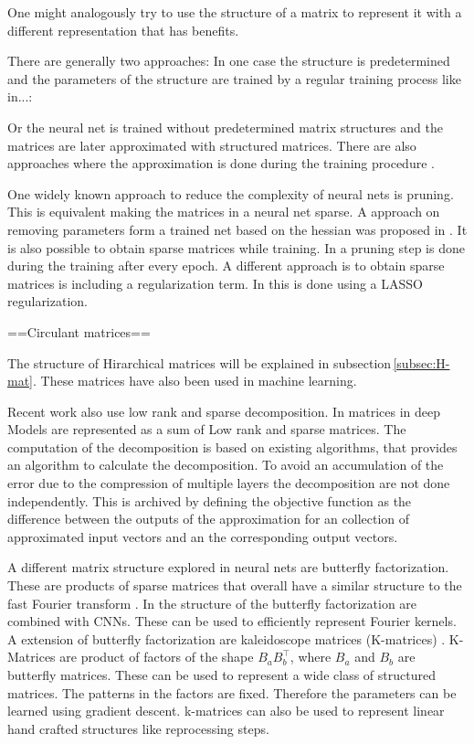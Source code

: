 \documentclass[doctype=mastersthesis,BCOR=15mm,biblatex]{ldvbook}%
\begin{document}
One might analogously try to use the structure of a matrix to represent it with a different representation that has benefits.

There are generally two approaches:
In one case the structure is predetermined and the parameters of the structure are trained by a regular training process like in...:

Or the neural net is trained without predetermined matrix structures and the matrices are later approximated with structured matrices. There are also approaches where the approximation is done during the training procedure \cite{dettmers_sparse_2019}.

One widely known approach to reduce the complexity of neural nets is pruning. 
This is equivalent making the matrices in a neural net sparse.
A approach on removing parameters form a trained net based on the hessian was proposed in \cite{hassibi_optimal_1993}.
It is also possible to obtain sparse matrices while training.
In \cite{dettmers_sparse_2019} a pruning step is done during the training after every epoch.
A different approach is to obtain sparse matrices is including a regularization term.
In \cite{louizos_learning_2018,wen_learning_2016} this is done using a LASSO regularization.

==Circulant matrices==


The structure of Hirarchical matrices will be explained in subsection\,\ref{subsec:H-mat}. These matrices have also been used in machine learning. 

Recent work also use low rank and sparse decomposition. 
In \cite{yu_compressing_2017} matrices in deep Models are represented as a sum of Low rank and sparse matrices.
The computation of the decomposition is based on existing algorithms, that provides an algorithm to calculate the decomposition.
To avoid an accumulation of the error due to the compression of multiple layers the decomposition are not done independently.
This is archived by defining the objective function as the difference between the outputs of the approximation for an collection of approximated input vectors and an the corresponding output vectors.

A different matrix structure explored in neural nets are butterfly factorization. 
These are products of sparse matrices that overall have a similar structure to the fast Fourier transform \cite{li_butterfly_2015,parker_random_1995}.
In \cite{li_butterfly-net_2020} the structure of the butterfly factorization are combined with CNNs. These can be used to efficiently represent Fourier kernels.
A extension of butterfly factorization are kaleidoscope matrices (K-matrices) \cite{dao_kaleidoscope_2020}.
K-Matrices are product of factors of the shape $B_aB_b^\top$, where $B_a$ and $B_b$ are butterfly matrices. These can be used to represent a wide class of structured matrices.
The patterns in the factors are fixed. Therefore the parameters can be learned using gradient descent.
k-matrices can also be used to represent linear hand crafted structures like reprocessing steps. %
\end{document}
